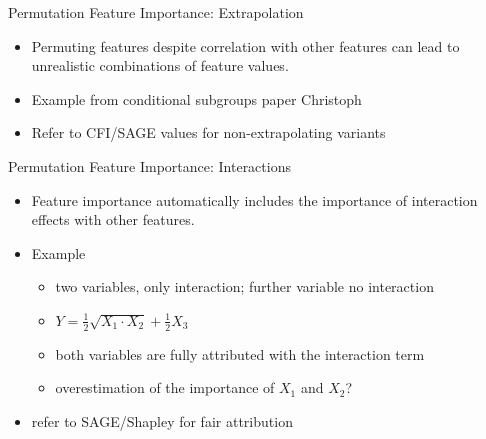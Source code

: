 \documentclass[11pt,compress,t,notes=noshow, xcolor=table]{beamer}
\begin{document}
\begin{vbframe}{Permutation Feature Importance: Extrapolation}
 \begin{itemize}
 \itemsep1em
  \item Permuting features despite correlation with other features can lead to unrealistic combinations of feature values.
  \item Example from conditional subgroups paper Christoph
  \item Refer to CFI/SAGE values for non-extrapolating variants
 \end{itemize}
\end{vbframe}

\begin{vbframe}{Permutation Feature Importance: Interactions}
 \begin{itemize}
 \itemsep1em
  \item Feature importance automatically includes the importance of interaction effects with other features.
  \item Example
  \begin{itemize}
    \item two variables, only interaction; further variable no interaction
    \item $Y = \frac{1}{2} \sqrt{X_1 \cdot X_2} + \frac{1}{2} X_3$
    \item both variables are fully attributed with the interaction term
    \item overestimation of the importance of $X_1$ and $X_2$?
 \end{itemize}
 \item refer to SAGE/Shapley for fair attribution
 \end{itemize}
\end{vbframe}
\end{document}
